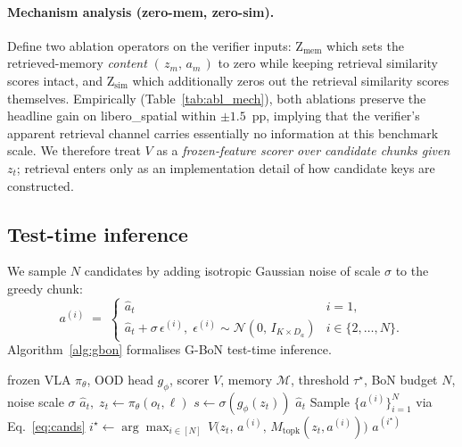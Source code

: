 \documentclass{article}
\begin{document}
\paragraph{Mechanism analysis (zero-mem, zero-sim).}
Define two ablation operators on the verifier inputs: $\mathrm{Z_{mem}}$ which
sets the retrieved-memory \emph{content} $(\,z_m,\,a_m\,)$ to zero
while keeping retrieval similarity scores intact, and
$\mathrm{Z_{sim}}$ which additionally zeros out the retrieval similarity scores
themselves. Empirically (Table~\ref{tab:abl_mech}), both ablations
preserve the headline gain on libero\_spatial within $\pm 1.5$~pp,
implying that the verifier's apparent retrieval channel carries
essentially no information at this benchmark scale. We therefore
treat $V$ as a \emph{frozen-feature scorer over candidate chunks
given $z_t$}; retrieval enters only as an implementation detail of
how candidate keys are constructed.

\subsection{Test-time inference}
\label{sec:method:inference}

We sample $N$ candidates by adding isotropic Gaussian noise of scale
$\sigma$ to the greedy chunk:
\begin{equation}
  a^{(i)} \;=\;
  \begin{cases}
  \hat a_t & i = 1, \\
  \hat a_t + \sigma\,\epsilon^{(i)},\;
  \epsilon^{(i)}\sim\mathcal{N}(0,\,I_{K\!\times\!D_a}) & i \in \{2,\dots,N\}.
  \end{cases}
  \label{eq:cands}
\end{equation}
Algorithm~\ref{alg:gbon} formalises G-BoN test-time inference.

\begin{algorithm}[t]
\caption{G-BoN test-time inference}
\label{alg:gbon}
\begin{algorithmic}[1]
\Require frozen VLA $\pi_\theta$, OOD head $g_\phi$, scorer $V$, memory $\mathcal{M}$, threshold $\tau^\star$, BoN budget $N$, noise scale $\sigma$
\State $\hat a_t,\;z_t \gets \pi_\theta(o_t, \ell)$ 
\State $s \gets \sigma(g_\phi(z_t))$ 
  \State \Return $\hat a_t$ 
\EndIf
\State Sample $\{a^{(i)}\}_{i=1}^N$ via Eq.~\eqref{eq:cands}
\State $i^\star \gets \arg\max_{i\in[N]}\, V\bigl(z_t,\,a^{(i)},\,M_{\mathrm{topk}}(z_t, a^{(i)})\bigr)$
\State \Return $a^{(i^\star)}$
\end{algorithmic}
\end{algorithm}
\end{document}

